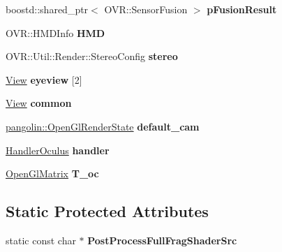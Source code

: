 \begin{DoxyCompactItemize}
\item 
boostd\+::shared\+\_\+ptr$<$ O\+V\+R\+::\+Sensor\+Fusion $>$ {\bfseries p\+Fusion\+Result}\hypertarget{classpangolin_1_1_oculus_hud_a830ee6e33a93079a9dc0ccba022e32da}{}\label{classpangolin_1_1_oculus_hud_a830ee6e33a93079a9dc0ccba022e32da}

\item 
O\+V\+R\+::\+H\+M\+D\+Info {\bfseries H\+MD}\hypertarget{classpangolin_1_1_oculus_hud_a30b1761772efda31b1517e7a42ab7dff}{}\label{classpangolin_1_1_oculus_hud_a30b1761772efda31b1517e7a42ab7dff}

\item 
O\+V\+R\+::\+Util\+::\+Render\+::\+Stereo\+Config {\bfseries stereo}\hypertarget{classpangolin_1_1_oculus_hud_a3a52b5f33ea26d50ac54cb53f9f14acf}{}\label{classpangolin_1_1_oculus_hud_a3a52b5f33ea26d50ac54cb53f9f14acf}

\item 
\hyperlink{structpangolin_1_1_view}{View} {\bfseries eyeview} \mbox{[}2\mbox{]}\hypertarget{classpangolin_1_1_oculus_hud_a06e6516d4341cdc2d5b98c2897a069a2}{}\label{classpangolin_1_1_oculus_hud_a06e6516d4341cdc2d5b98c2897a069a2}

\item 
\hyperlink{structpangolin_1_1_view}{View} {\bfseries common}\hypertarget{classpangolin_1_1_oculus_hud_a834a1c748899ecc8e9090ea8cf14e801}{}\label{classpangolin_1_1_oculus_hud_a834a1c748899ecc8e9090ea8cf14e801}

\item 
\hyperlink{classpangolin_1_1_open_gl_render_state}{pangolin\+::\+Open\+Gl\+Render\+State} {\bfseries default\+\_\+cam}\hypertarget{classpangolin_1_1_oculus_hud_ae2286e2e274d229b74e8e31570068e39}{}\label{classpangolin_1_1_oculus_hud_ae2286e2e274d229b74e8e31570068e39}

\item 
\hyperlink{structpangolin_1_1_handler_oculus}{Handler\+Oculus} {\bfseries handler}\hypertarget{classpangolin_1_1_oculus_hud_acecb8fcd708b07cb6f6ec714b0c19584}{}\label{classpangolin_1_1_oculus_hud_acecb8fcd708b07cb6f6ec714b0c19584}

\item 
\hyperlink{structpangolin_1_1_open_gl_matrix}{Open\+Gl\+Matrix} {\bfseries T\+\_\+oc}\hypertarget{classpangolin_1_1_oculus_hud_ae9807a880fc6da480dab82371ecf8702}{}\label{classpangolin_1_1_oculus_hud_ae9807a880fc6da480dab82371ecf8702}

\end{DoxyCompactItemize}
\subsection*{Static Protected Attributes}
\begin{DoxyCompactItemize}
\item 
static const char $\ast$ {\bfseries Post\+Process\+Full\+Frag\+Shader\+Src}\hypertarget{classpangolin_1_1_oculus_hud_a2299def7aff61105bdca9aa351358234}{}\label{classpangolin_1_1_oculus_hud_a2299def7aff61105bdca9aa351358234}

\end{DoxyCompactItemize}
